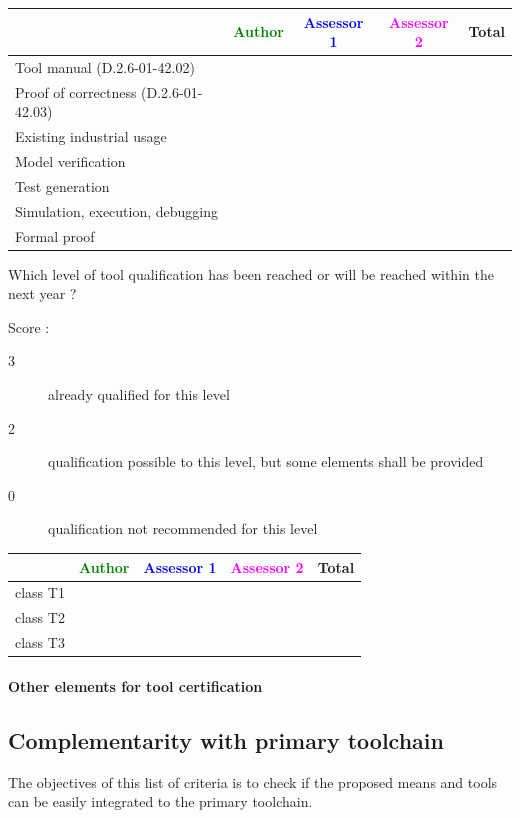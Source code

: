 \begin{tabular}{|l | c | c | c | c|}
\hline
& \textcolor{green}{Author} & \textcolor{blue}{Assessor 1} & \textcolor{magenta}{Assessor 2} & Total \\
\hline 
Tool manual (D.2.6-01-42.02) & & & &  \\
\hline
Proof of correctness (D.2.6-01-42.03)   & & & & \\
\hline
Existing industrial  usage  & & & & \\
\hline
Model verification & & & & \\
\hline
Test generation & & & & \\
\hline
Simulation, execution, debugging & & & & \\
\hline
Formal proof & & & & \\
\hline
\end{tabular}


Which level of tool qualification has been reached or will be reached within the next year ?

Score :
\begin{description}
\item[3] already qualified for this level
\item[2] qualification possible to this level, but some elements shall be provided
\item[0] qualification not recommended for this level
\end{description}


\begin{tabular}{|l | c | c | c | c|}
\hline
& \textcolor{green}{Author} & \textcolor{blue}{Assessor 1} & \textcolor{magenta}{Assessor 2} & Total \\
\hline 
class T1 & & & &  \\
\hline
class T2   & & & & \\
\hline
class T3  & & & & \\
\hline
\end{tabular}

\paragraph{Other elements for tool certification}


\subsection{Complementarity with primary toolchain}

The objectives of this list of criteria is to check if the proposed means and tools can be easily integrated to the primary toolchain.


